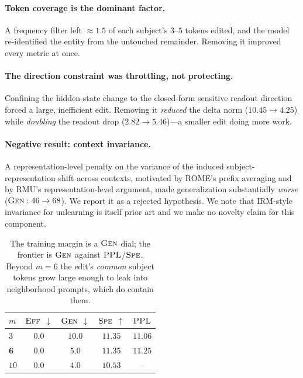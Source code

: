 \documentclass[11pt]{article}
\newcommand{\Eff}{\textsc{Eff}}
\newcommand{\Gen}{\textsc{Gen}}
\newcommand{\Spe}{\textsc{Spe}}
\newcommand{\PPL}{\textsc{PPL}}
\newcommand{\down}{$\downarrow$}
\newcommand{\up}{$\uparrow$}
\begin{document}
\paragraph{Token coverage is the dominant factor.} A frequency filter left
$\approx 1.5$ of each subject's $3$--$5$ tokens edited, and the model
re-identified the entity from the untouched remainder. Removing it improved
every metric at once.

\paragraph{The direction constraint was throttling, not protecting.}
Confining the hidden-state change to the closed-form sensitive readout
direction forced a large, inefficient edit. Removing it \emph{reduced} the
delta norm ($10.45 \rightarrow 4.25$) while \emph{doubling} the readout drop
($2.82 \rightarrow 5.46$)---a smaller edit doing more work.

\paragraph{Negative result: context invariance.} A representation-level penalty
on the variance of the induced subject-representation shift across contexts,
motivated by ROME's prefix averaging and by RMU's representation-level
argument, made generalization substantially \emph{worse}
($\Gen: 46 \rightarrow 68$). We report it as a rejected hypothesis. We note
that IRM-style invariance for unlearning is itself prior art and we make no
novelty claim for this component.

\begin{table}[h]
\centering
\caption{The training margin is a $\Gen$ dial; the frontier is $\Gen$ against
$\PPL$/$\Spe$. Beyond $m = 6$ the edit's \emph{common} subject tokens grow
large enough to leak into neighborhood prompts, which do contain them.}
\label{tab:margin}
\begin{tabular}{lcccc}
\toprule
$m$ & $\Eff$ \down & $\Gen$ \down & $\Spe$ \up & $\PPL$ \\
\midrule
$3$           & $0.0$ & $10.0$ & $11.35$ & $11.06$ \\
$\mathbf{6}$  & $\mathbf{0.0}$ & $\mathbf{5.0}$ & $\mathbf{11.35}$ & $\mathbf{11.25}$ \\
$10$          & $0.0$ & $4.0$  & $10.53$ & -- \\
\bottomrule
\end{tabular}
\end{table}
\end{document}
